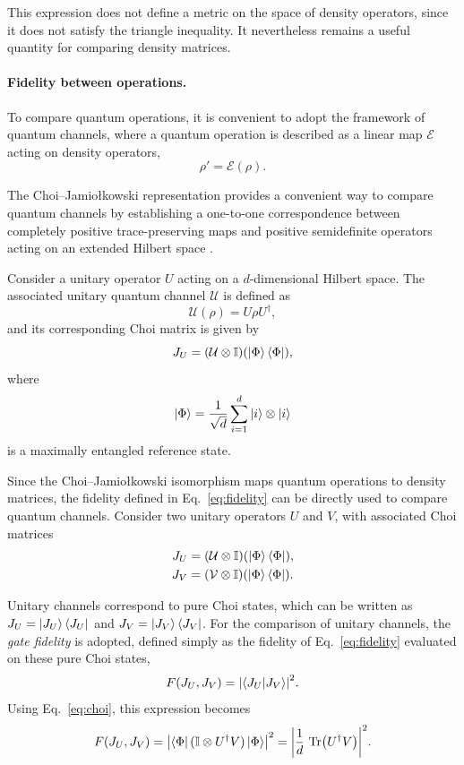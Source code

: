 This expression does not define a metric on the space of density operators, since it does not satisfy the triangle inequality. It nevertheless remains a useful quantity for comparing density matrices.

\paragraph{Fidelity between operations.}
To compare quantum operations, it is convenient to adopt the framework of quantum channels, where a quantum operation is described as a linear map $\mathcal{E}$ acting on density operators,
\begin{equation}
    \rho' = \mathcal{E}(\rho).
\end{equation}

The Choi--Jamiołkowski representation provides a convenient way to compare quantum channels by establishing a one-to-one correspondence between completely positive trace-preserving maps and positive semidefinite operators acting on an extended Hilbert space \cite{Watrous2018}.

Consider a unitary operator $U$ acting on a $d$-dimensional Hilbert space. The associated unitary quantum channel $\mathcal{U}$ is defined as
\begin{equation}
    \mathcal{U}(\rho) = U \rho U^\dagger,
\end{equation}
and its corresponding Choi matrix is given by
\begin{equation}
    \label{eq:choi}
    J_U = (\mathcal{U} \otimes \mathbb{I})\qty(\ket{\Phi}\bra{\Phi}),
\end{equation}
where
\begin{equation}
    \ket{\Phi} = \frac{1}{\sqrt{d}} \sum_{i=1}^{d} \ket{i} \otimes \ket{i}
\end{equation}
is a maximally entangled reference state.

Since the Choi--Jamiołkowski isomorphism maps quantum operations to density matrices, the fidelity defined in Eq.~\eqref{eq:fidelity} can be directly used to compare quantum channels. Consider two unitary operators $U$ and $V$, with associated Choi matrices
\begin{align}
    J_U & = (\mathcal{U} \otimes \mathbb{I})\qty(\ket{\Phi}\bra{\Phi}), \\
    J_V & = (\mathcal{V} \otimes \mathbb{I})\qty(\ket{\Phi}\bra{\Phi}).
\end{align}

Unitary channels correspond to pure Choi states, which can be written as $J_U = \ket{J_U}\bra{J_U}$ and $J_V = \ket{J_V}\bra{J_V}$. For the comparison of unitary channels, the \emph{gate fidelity} is adopted, defined simply as the fidelity of Eq.~\eqref{eq:fidelity} evaluated on these pure Choi states,
\begin{equation}
    F(J_U, J_V) = \qty| \braket{J_U}{J_V} |^2 .
\end{equation}
Using Eq.~\eqref{eq:choi}, this expression becomes
\begin{equation}
    \label{eq:gate_fidelity}
    F(J_U, J_V)
    =
    \qty| \bra{\Phi} (\mathbb{I} \otimes U^\dagger V) \ket{\Phi} |^2
    =
    \qty| \frac{1}{d}\, \Tr(U^\dagger V) |^2 .
\end{equation}

